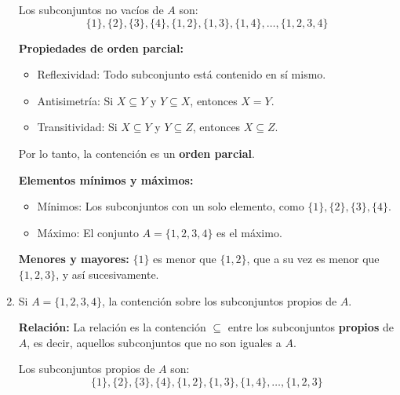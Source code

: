 \begin{solution}
\begin{enumerate}
        Los subconjuntos no vacíos de \( A \) son:
        \[
        \{1\}, \{2\}, \{3\}, \{4\}, \{1, 2\}, \{1, 3\}, \{1, 4\}, \dots, \{1, 2, 3, 4\}
        \]
        
        \textbf{Propiedades de orden parcial:}
        \begin{itemize}
            \item Reflexividad: Todo subconjunto está contenido en sí mismo.
            \item Antisimetría: Si \( X \subseteq Y \) y \( Y \subseteq X \), entonces \( X = Y \).
            \item Transitividad: Si \( X \subseteq Y \) y \( Y \subseteq Z \), entonces \( X \subseteq Z \).
        \end{itemize}
        
        Por lo tanto, la contención es un \textbf{orden parcial}.
        
        
        
        \textbf{Elementos mínimos y máximos:}
        \begin{itemize}
            \item Mínimos: Los subconjuntos con un solo elemento, como \( \{1\}, \{2\}, \{3\}, \{4\} \).
            \item Máximo: El conjunto \( A = \{1, 2, 3, 4\} \) es el máximo.
        \end{itemize}
        
        \textbf{Menores y mayores:}
        \( \{1\} \) es menor que \( \{1, 2\} \), que a su vez es menor que \( \{1, 2, 3\} \), y así sucesivamente.
        
        \item Si \( A = \{1, 2, 3, 4\} \), la contención sobre los subconjuntos propios de \( A \).

        \textbf{Relación:}
        La relación es la contención \( \subseteq \) entre los subconjuntos \textbf{propios} de \( A \), es decir, aquellos subconjuntos que no son iguales a \( A \).
        
        Los subconjuntos propios de \( A \) son:
        \[
        \{1\}, \{2\}, \{3\}, \{4\}, \{1, 2\}, \{1, 3\}, \{1, 4\}, \dots, \{1, 2, 3\}
        \]
        

\end{enumerate}
\end{solution}
